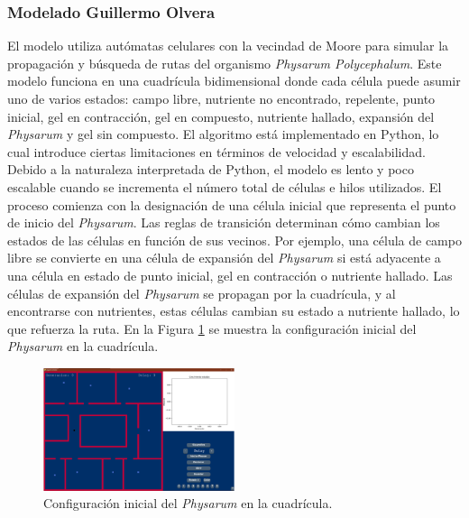 \subsubsection{Modelado Guillermo Olvera} %
\label{ssub:ModeladoGuillermoOlvera}
    El modelo utiliza aut\'omatas celulares con la vecindad de Moore para simular la propagaci\'on y b\'usqueda de rutas del organismo 
        \textit{Physarum Polycephalum}. Este modelo funciona en una cuadr\'icula bidimensional donde cada c\'elula puede asumir 
        uno de varios estados: campo libre, nutriente no encontrado, repelente, punto inicial, gel en contracci\'on, 
        gel en compuesto, nutriente hallado, expansi\'on del \textit{Physarum} y gel sin compuesto.
    \vskip 0.5cm
    El algoritmo est\'a implementado en Python, lo cual introduce ciertas limitaciones en t\'erminos de 
        velocidad y escalabilidad. Debido a la naturaleza interpretada de Python, el modelo es lento 
        y poco escalable cuando se incrementa el n\'umero total de c\'elulas e hilos utilizados.
    \vskip 0.5cm
    El proceso comienza con la designaci\'on de una c\'elula inicial que representa el punto de inicio del \textit{Physarum}. 
        Las reglas de transici\'on determinan c\'omo cambian los estados de las c\'elulas en funci\'on de sus vecinos. Por ejemplo, 
        una c\'elula de campo libre se convierte en una c\'elula de expansi\'on del \textit{Physarum} si est\'a adyacente a una 
        c\'elula en estado de punto inicial, gel en contracci\'on o nutriente hallado. Las c\'elulas de expansi\'on del \textit{Physarum} 
        se propagan por la cuadr\'icula, y al encontrarse con nutrientes, estas c\'elulas cambian su estado a nutriente hallado, 
        lo que refuerza la ruta. En la Figura \ref{fig:initial_state} se muestra la configuraci\'on inicial del \textit{Physarum} en la cuadr\'icula.
    \vskip 0.5cm
    \begin{figure}[h]
        \centering
        \includegraphics[width=0.5\textwidth]{./images/estado_del_arte/physarum/estadoInicialOlvera.png}
        \caption{Configuraci\'on inicial del \textit{Physarum} en la cuadr\'icula. \cite{Olvera2023}}
        \label{fig:initial_state}
    \end{figure}
